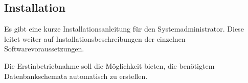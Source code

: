\subsection{Installation}

\begin{description}
	 Es gibt eine kurze Installationsanleitung für den Systemadministrator. Diese leitet weiter auf Installationsbeschreibungen der einzelnen Softwarevoraussetzungen.

	 Die Erstinbetriebnahme soll die Möglichkeit bieten, die benötigtem Datenbankschemata automatisch zu erstellen.
\end{description}
